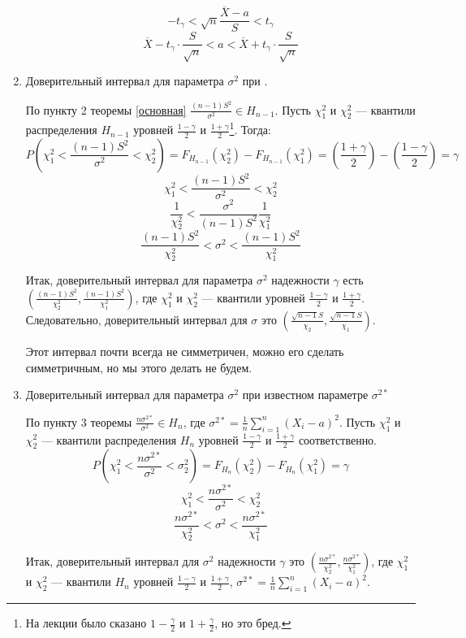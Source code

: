 \begin{enumerate}
          \[
              - t_\gamma < \sqrt{n} \frac{ \overline{X} - a}{S} < t_\gamma
          \]
          \[
              \overline{X} - t_\gamma \cdot \frac{S}{\sqrt{n}} < a < \overline{X} + t_\gamma \cdot \frac{S}{\sqrt{n}}
          \]
    \item Доверительный интервал для параметра \(\sigma^2\) при \?.

          По пункту 2 теоремы \ref{основная} \(\frac{(n - 1)S^2}{\sigma^2} \in H_{n-1}\). Пусть \(\chi_1^2\) и \(\chi_2^2\) --- квантили распределения \(H_{n-1}\) уровней \(\frac{1 - \gamma}{2}\) и \(\frac{1 + \gamma}{2}\)\footnote{На лекции было сказано \(1 - \frac{\gamma}{2}\) и \(1 + \frac{\gamma}{2}\), но это бред.}. Тогда:
          \[P\left(\chi_1^2 < \frac{(n - 1)S^2}{\sigma^2} < \chi_2^2\right) = F_{H_{n-1}}(\chi_2^2) - F_{H_{n-1}}(\chi_1^2) = \left(\frac{1 + \gamma}{2}\right) - \left(\frac{1 - \gamma}{2}\right) = \gamma\]
          \[\chi_1^2 < \frac{(n - 1) S^2}{\sigma^2} < \chi_2^2\]
          \[\frac{1}{\chi_2^2} < \frac{\sigma^2}{(n - 1) S^2} \frac{1}{\chi_1^2}\]
          \[\frac{(n - 1) S^2}{\chi_2^2} < \sigma^2 < \frac{(n - 1) S^2}{\chi_1^2}\]

          Итак, доверительный интервал для параметра \(\sigma^2\) надежности \(\gamma\) есть \(\left(\frac{(n - 1) S^2}{\chi_2^2}, \frac{(n - 1) S^2}{\chi_1^2}\right)\), где \(\chi_1^2\) и \(\chi_2^2\) --- квантили уровней \(\frac{1 - \gamma}{2}\) и \(\frac{1 + \gamma}{2}\). Следовательно, доверительный интервал для \(\sigma\) это \(\left(\frac{\sqrt{n - 1} S}{\chi_2}, \frac{\sqrt{n - 1} S}{\chi_1}\right)\).

          Этот интервал почти всегда не симметричен, можно его сделать симметричным, но мы этого делать не будем.
    \item Доверительный интервал для параметра \(\sigma^2\) при известном параметре \(\sigma^{2*}\)

          По пункту 3 теоремы \(\frac{n \sigma^{2*}}{\sigma^2} \in H_n\), где \(\sigma^{2*} = \frac{1}{n} \sum_{i=1}^{n} (X_i - a)^2\).
          Пусть \(\chi_1^2\) и \(\chi_2^2\) --- квантили распределения \(H_n\) уровней \(\frac{1 - \gamma}{2}\) и \(\frac{1 + \gamma}{2}\) соответственно.
          \[P\left(\chi_1^2 < \frac{n \sigma^{2*}}{\sigma^2} < \sigma_2^2\right) = F_{H_n} (\chi_2^2) - F_{H_n}(\chi_1^2) = \gamma\]
          \[\chi_1^2 < \frac{n \sigma^{2*}}{\sigma^2} < \chi_2^2\]
          \[\frac{n \sigma^{2*}}{\chi_2^2} < \sigma^2 < \frac{n\sigma^{2*}}{\chi_1^2}\]

          Итак, доверительный интервал для \(\sigma^2\) надежности \(\gamma\) это \(\left(\frac{n \sigma^{2*}}{\chi_2^2}, \frac{n\sigma^{2*}}{\chi_1^2}\right)\), где \(\chi_1^2\) и \(\chi_2^2\) --- квантили \(H_n\) уровней \(\frac{1 - \gamma}{2}\) и \(\frac{1 + \gamma}{2}\), \(\sigma^{2*} = \frac{1}{n} \sum_{i=1}^{n} (X_i - a)^2\).
\end{enumerate}

